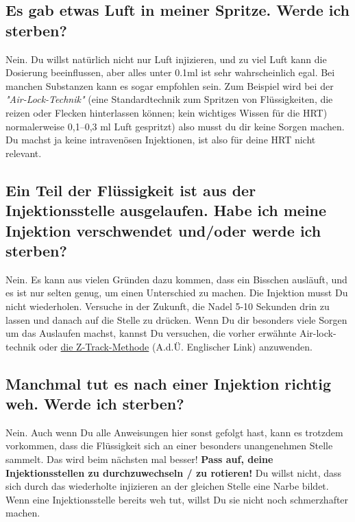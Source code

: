 \documentclass{article}
\begin{document}
{{\subsection{Es gab etwas Luft in meiner Spritze. Werde ich sterben?}\label{7-7}

Nein. Du willst natürlich nicht nur Luft injizieren, und zu viel Luft kann die Dosierung beeinflussen, aber alles unter 0.1ml ist sehr wahrscheinlich egal. Bei manchen Substanzen kann es sogar empfohlen sein. Zum Beispiel wird bei der \textit{"Air-Lock-Technik"} (eine Standardtechnik zum Spritzen von Flüssigkeiten, die reizen oder Flecken hinterlassen können; kein wichtiges Wissen für die HRT) normalerweise 0,1–0,3 ml Luft gespritzt) also musst du dir keine Sorgen machen. Du machst ja keine intravenösen Injektionen, ist also für deine HRT nicht relevant. 

\subsection{Ein Teil der Flüssigkeit ist aus der Injektionsstelle ausgelaufen. Habe ich meine Injektion verschwendet und/oder werde ich sterben?}

Nein. Es kann aus vielen Gründen dazu kommen, dass ein Bisschen ausläuft, und es ist nur selten genug, um einen Unterschied zu machen. Die Injektion musst Du nicht wiederholen. Versuche in der Zukunft, die Nadel 5-10 Sekunden drin zu lassen und danach auf die Stelle zu drücken. Wenn Du dir besonders viele Sorgen um das Auslaufen machst, kannst Du versuchen, die vorher erwähnte Air-lock-technik oder \href{https://www.nurse.com/nursing-resources/definitions/what-is-z-track-method/}{die Z-Track-Methode} (A.d.Ü. Englischer Link) anzuwenden. 

\subsection{Manchmal tut es nach einer Injektion richtig weh. Werde ich sterben?}

Nein. Auch wenn Du alle Anweisungen hier sonst gefolgt hast, kann es trotzdem vorkommen, dass die Flüssigkeit sich an einer besonders unangenehmen Stelle sammelt. Das wird beim nächsten mal besser! \textbf{Pass auf, deine Injektionsstellen zu durchzuwechseln / zu rotieren!} Du willst nicht, dass sich durch das wiederholte injizieren an der gleichen Stelle eine Narbe bildet. Wenn eine Injektionsstelle bereits weh tut, willst Du sie nicht noch schmerzhafter machen.

}}
\end{document}

